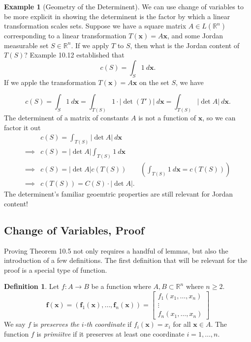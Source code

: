 \documentclass{article}
\newcommand{\R}{\mathbb{R}}
\newcommand{\x}{\mathbf{x}}
\newcommand{\f}{\mathbf{f}}
\newcommand{\abs}[1]{\left\lvert#1\right\rvert}
\theoremstyle{definition}
\newtheorem{definition}{Definition}[section]
\newtheorem{example}{Example}[section]
\begin{document}
\begin{example}[Geometry of the Determinent]
	We can use change of variables to be more explicit in showing the determinent is the factor by which a linear transformation scales sets. Suppose we have a square matrix $A \in L(\R^n)$ corresponding to a linear transformation $T(\x)= A\x$, and some Jordan measurable set $S \in \R^n$. If we apply $T$ to $S$, then what is the Jordan content of $T(S)$? Example 10.12 established that 
	$$ c(S) = \int_S 1\ d\x.$$ If we apple the transformation $T(\x) = A\x$ on the set $S$, we have  
	
	$$ c(S) = \int_S 1\ d\x = \int_{T(S)} 1\cdot\abs{ \det(T') }\ d\x = \int_{T(S)}\abs{ \det A }\ d\x. $$ The determinent of a matrix of constants $A$ is not a function of $\x$, so we can factor it out 
	\begin{align*}
		&c(S) = \int_{T(S) }\abs{\det A}\ d\x\\
		\implies & c(S) = \abs{\det A} \int_{T(S)}1\ d\x \\
		\implies & c(S) = \abs{\det A} c(T(S)) & \left( \int_{T(S)}1\ d\x = c(T(S))\right)\\
		\implies & c(T(S)) = C(S)\cdot \abs{\det A}.
	\end{align*}
The determinent's familiar geoemtric properties are still relevant for Jordan content! 
\end{example}
	
	\subsection{Change of Variables, Proof}
	Proving Theorem 10.5 not only requires a handful of lemmas, but also the introduction of a few definitions. The first definition that will be relevant for the proof is a special type of function. 
	\begin{definition}\label{def10.10}
		Let $f:A\to B$ be a function where $A,B\subset \R^n$ where $n\ge 2$.
		$$\f(\x) = (\f_1(\x), \ldots, \f_n(\x)) = \begin{bmatrix}
			f_1(x_1,\ldots,x_n)\\
			\vdots \\
						f_n(x_1,\ldots,x_n)
		\end{bmatrix} $$
		We say $f$ is \textit{\color{red}preserves the $i$-th coordinate } if $f_i(\x) = x_i$ for all $\x \in A$. The function $f$ is \textit{\color{red}primiitve} if it preserves at least one coordinate $i=1,\ldots,n$.

\end{definition}
\end{document}
